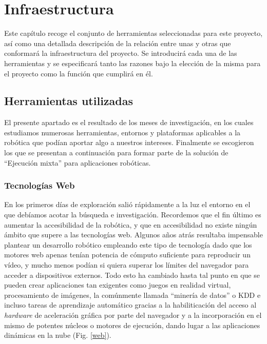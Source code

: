 \chapter{Infraestructura}

Este capítulo recoge el conjunto de herramientas seleccionadas para este proyecto, así como una detallada descripción de la relación entre unas y otras que conformará la infraestructura del proyecto.
Se introducirá cada una de las herramientas y se especificará tanto las razones bajo la elección de la misma para el proyecto como la función que cumplirá en él.

\section{Herramientas utilizadas}

El presente apartado es el resultado de los meses de investigación, en los cuales estudiamos numerosas herramientas, entornos y plataformas aplicables a la robótica que podían aportar algo a nuestros intereses. Finalmente se escogieron los que se presentan a continuación para formar parte de la solución de ``Ejecución mixta'' para aplicaciones robóticas.

\subsection{Tecnologías Web}

En los primeros días de exploración salió rápidamente a la luz el entorno en el que debíamos acotar la búsqueda e investigación. Recordemos que el fin último es aumentar la accesibilidad de la robótica, y que en accesibilidad no existe ningún ámbito que supere a las tecnologías web. Algunos años atrás resultaba impensable plantear un desarrollo robótico empleando este tipo de tecnología dado que los motores web apenas tenían potencia de cómputo suficiente para reproducir un vídeo, y mucho menos podían si quiera superar los límites del navegador para acceder a dispositivos externos. Todo esto ha cambiado hasta tal punto en que se pueden crear aplicaciones tan exigentes como juegos en realidad virtual, procesamiento de imágenes, la comúnmente llamada ``minería de datos'' o KDD e incluso tareas de aprendizaje automático gracias a la habiliticación del acceso al \textit{hardware} de aceleración gráfica por parte del navegador y a la incorporación en el mismo de potentes núcleos o motores de ejecución, dando lugar a las aplicaciones dinámicas en la nube (Fig. \ref{web}).

